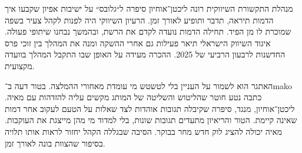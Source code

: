 

{\fontsize{14.2}{21.3}\selectfont

מנהלת התקשורת השיווקית רונה ליכטן־אוחיון סיפרה ל״גלובס״ על ישיבות אפיון שקבעו איך הדמות תיראה, תדבר ותופיע לאורך זמן. הרעיון השיווקי היה לפנות לקהל צעיר בשפה שמוכרת לו מן הפיד. תחילה הדמות נועדה לקדם את הרשת, ובהמשך נבחנו שיתופי פעולה. איגוד השיווק הישראלי תיאר פעילות גם אחרי ההשקה ומנה את המהלך בין זוכי פרס החדשנות לרבעון הרביעי של 2025. ההכרה מעידה על האופן שבו התקבל המהלך בוועדה מקצועית. 

\par}


{\fontsize{13.8}{21.3}\selectfont

האתגר הוא לשמור על העניין בלי לטשטש מי עומדת מאחורי ההמלצה. בטור דעה ב־\textenglish{mako} כתבה נטע חוטר שהליטוש והשליטה של המותג מקשים עליה להזדהות עם מאיה. ליכטן־אוחיון, מנגד, סיפרה שקיבלה תגובות אוהדות לצד שאלות על הטעם לעקוב אחר דמות שאינה קיימת. הטור והריאיון מתעדים תגובות שונות, בלי למדוד מי מהן מייצגת את העוקבות. מאיה יכולה להציג לוק חדש מחר בבוקר. הסיבה שבגללה הקהל יחזור לראות אותו תלויה בסיפור שהצוות בונה לאורך זמן. 

\par}
